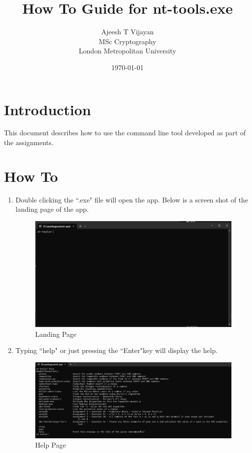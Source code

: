 \documentclass{article}
\title{How To Guide for nt-tools.exe}
\author{Ajeesh T Vijayan  \\
    MSc Cryptography  \\
    London Metropolitan University
}
\date{\today}
\begin{document}
    \maketitle

    \section*{Introduction}
    This document describes how to use the command line tool developed as part of the assignments.

    \section*{How To}

    \begin{enumerate}
        \item Double clicking the ``.exe" file will open the app. Below is a screen shot of the landing page of the app.
        \begin{figure}[H]
            \centering
            \includegraphics[scale=0.35]{landing_page.png}
            \caption{Landing Page}
        \end{figure}
        \item Typing ``help" or just pressing the ``Enter"\Return key will display the help.
        \begin{figure}[H]
            \centering
            \includegraphics[scale=0.35]{help_page.png}
            \caption{Help Page}
        \end{figure}
    \end{enumerate}
\end{document}
